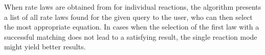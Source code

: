 When rate laws are obtained from \SABIO for individual reactions, the algorithm presents a list of all rate laws found for the given query to the user, who can then select the most appropriate equation.
In cases when the selection of the first law with a successful matching does not lead to a satisfying result, the single reaction mode might yield better results.



